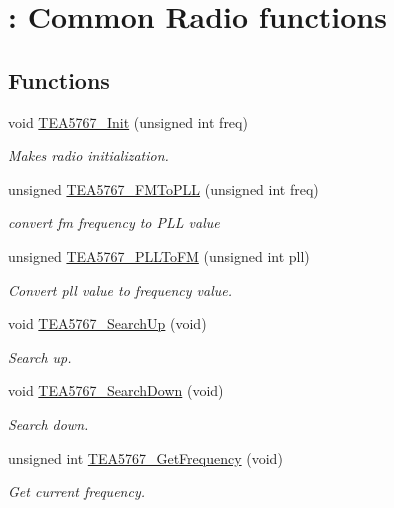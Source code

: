 \hypertarget{group___radio}{\section{\+: Common Radio functions}
\label{group___radio}
}
\subsection*{Functions}
\begin{DoxyCompactItemize}
\item 
void \hyperlink{group___radio_gabd709714cae0abdd5e8ce6bf39afd678}{T\+E\+A5767\+\_\+\+Init} (unsigned int freq)
\begin{DoxyCompactList}\small\item\em Makes radio initialization. \end{DoxyCompactList}\item 
unsigned \hyperlink{group___radio_ga0d8dd84f9fe35c52858ed652592d72e8}{T\+E\+A5767\+\_\+\+F\+M\+To\+P\+L\+L} (unsigned int freq)
\begin{DoxyCompactList}\small\item\em convert fm frequency to P\+L\+L value \end{DoxyCompactList}\item 
unsigned \hyperlink{group___radio_gaf5ca2dac5766f45d859ec89d013b2153}{T\+E\+A5767\+\_\+\+P\+L\+L\+To\+F\+M} (unsigned int pll)
\begin{DoxyCompactList}\small\item\em Convert pll value to frequency value. \end{DoxyCompactList}\item 
void \hyperlink{group___radio_ga5dc56e855d544c8e68f14fbb0c9b41ed}{T\+E\+A5767\+\_\+\+Search\+Up} (void)
\begin{DoxyCompactList}\small\item\em Search up. \end{DoxyCompactList}\item 
void \hyperlink{group___radio_ga8d8df2bb004f98247675675b7e2aebce}{T\+E\+A5767\+\_\+\+Search\+Down} (void)
\begin{DoxyCompactList}\small\item\em Search down. \end{DoxyCompactList}\item 
unsigned int \hyperlink{group___radio_gae3031f3eb3e136b297c518dad7f41a02}{T\+E\+A5767\+\_\+\+Get\+Frequency} (void)
\begin{DoxyCompactList}\small\item\em Get current frequency. \end{DoxyCompactList}\item 

\end{DoxyCompactItemize}
